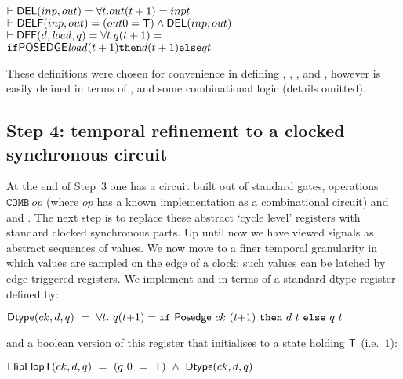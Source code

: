 \documentclass{llncs}
\begin{document}
\vspace*{-1mm}

{\begin{alltt}
\( \vdash \DEF{DEL}(inp,out)  = {\forall}t. out(t+1) = inp t                       \)
\( \vdash \DEF{DELF}(inp,out) = (out 0 = \DEF{T}) \wedge \DEF{DEL}(inp,out)                       \)
\( \vdash \DEF{DFF}(d,\VAR{load},q) = {\forall}t. q(t+1) = \)
\(                        \texttt{if} \DEF{POSEDGE} \VAR{load} (t+1) \texttt{then} d(t+1) \texttt{else} q t \)
\end{alltt}}

\vspace*{-1mm}

These definitions were chosen for convenience in defining
, , ,  and ,
however  is easily defined in terms of
,  and some combinational logic (details omitted).

\vspace*{-3mm}

\subsection*{Step 4: temporal refinement to a clocked synchronous circuit}

At the end of Step~3 one has a circuit built out of standard gates,
operations $\texttt{COMB}~op$ (where $op$ has a known implementation as
a combinational circuit) and  and .  The
next step is to replace these abstract `cycle level' registers with
standard clocked synchronous parts. Up until now we have viewed
signals as abstract sequences of values.  We now move to a finer
temporal granularity in which values are sampled on the edge of a
clock; such values can be latched by edge-triggered registers. We
implement  and  in terms of a standard dtype
register defined by:

\vspace*{1mm}

$\mathsf{Dtype}(ck,d,q) ~=~ \forall t.~q(t{+}1) = \texttt{if}~\mathsf{Posedge}~ck~(t{+}1)~\texttt{then}~d~t~\texttt{else}~q~t$

\vspace*{1mm}

\noindent and a boolean version of this register that initialises to a state holding $\mathsf{T}$ (i.e.~$1$):

\vspace*{1mm}

$\mathsf{FlipFlopT}(ck,d,q) ~ = ~ (q~0~ =~\mathsf{T})~\wedge~\mathsf{Dtype}(ck,d,q)$
\end{document}
